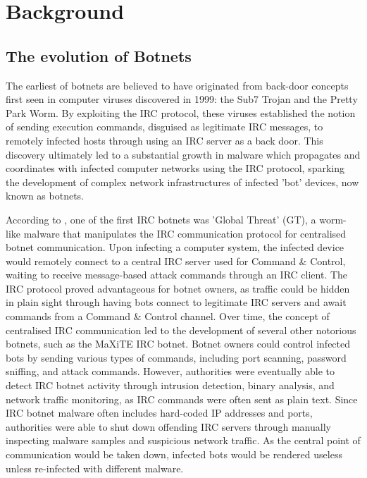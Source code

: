 

\chapter{Background}

\section{The evolution of Botnets}

The earliest of botnets are believed to have originated from back-door concepts first seen in computer viruses discovered in 1999: the Sub7 Trojan and the Pretty Park Worm. By exploiting the IRC protocol, these viruses established the notion of sending execution commands, disguised as legitimate IRC messages, to remotely infected hosts through using an IRC server as a back door. This discovery ultimately led to a substantial growth in malware which propagates and coordinates with infected computer networks using the IRC protocol, sparking the development of complex network infrastructures of infected 'bot' devices, now known as botnets. \citep{Ferguson2010}

According to \citet{Schiller2007}, one of the first IRC botnets was 'Global Threat' (GT), a worm-like malware that manipulates the IRC communication protocol for centralised botnet communication. Upon infecting a computer system, the infected device would remotely connect to a central IRC server used for Command \& Control, waiting to receive message-based attack commands through an IRC client. The IRC protocol proved advantageous for botnet owners, as traffic could be hidden in plain sight through having bots connect to legitimate IRC servers and await commands from a Command \& Control channel. Over time, the concept of centralised IRC communication led to the development of several other notorious botnets, such as the MaXiTE IRC botnet. Botnet owners could control infected bots by sending various types of commands, including port scanning, password sniffing, and attack commands. However, authorities were eventually able to detect IRC botnet activity through intrusion detection, binary analysis, and network traffic monitoring, as IRC commands were often sent as plain text. Since IRC botnet malware often includes hard-coded IP addresses and ports, authorities were able to shut down offending IRC servers through manually inspecting malware samples and suspicious network traffic. As the central point of communication would be taken down, infected bots would be rendered useless unless re-infected with different malware.

